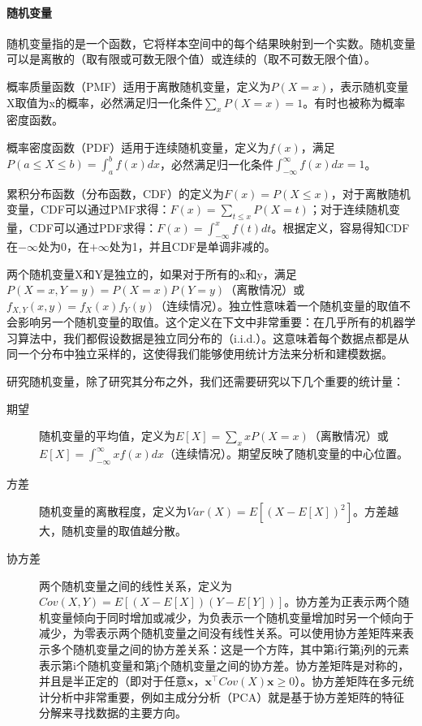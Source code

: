 \paragraph{随机变量}

随机变量指的是一个函数，它将样本空间中的每个结果映射到一个实数。随机变量可以是离散的（取有限或可数无限个值）或连续的（取不可数无限个值）。

概率质量函数（PMF）适用于离散随机变量，定义为$P(X=x)$，表示随机变量X取值为x的概率，必然满足归一化条件$\sum_x P(X=x) = 1$。有时也被称为概率密度函数。

概率密度函数（PDF）适用于连续随机变量，定义为$f(x)$，满足$P(a \leq X \leq b) = \int_a^b f(x) dx$，必然满足归一化条件$\int_{-\infty}^{\infty} f(x) dx = 1$。

累积分布函数（分布函数，CDF）的定义为$F(x) = P(X \leq x)$，对于离散随机变量，CDF可以通过PMF求得：$F(x) = \sum_{t \leq x} P(X=t)$；对于连续随机变量，CDF可以通过PDF求得：$F(x) = \int_{-\infty}^x f(t) dt$。根据定义，容易得知CDF在$-\infty$处为0，在$+\infty$处为1，并且CDF是单调非减的。

两个随机变量X和Y是独立的，如果对于所有的x和y，满足$P(X=x, Y=y) = P(X=x)P(Y=y)$（离散情况）或$f_{X,Y}(x,y) = f_X(x)f_Y(y)$（连续情况）。独立性意味着一个随机变量的取值不会影响另一个随机变量的取值。这个定义在下文中非常重要：在几乎所有的机器学习算法中，我们都假设数据是独立同分布的（i.i.d.）。这意味着每个数据点都是从同一个分布中独立采样的，这使得我们能够使用统计方法来分析和建模数据。

研究随机变量，除了研究其分布之外，我们还需要研究以下几个重要的统计量：
\begin{description}
    \item[期望] 随机变量的平均值，定义为$E[X] = \sum_x x P(X=x)$（离散情况）或$E[X] = \int_{-\infty}^{\infty} x f(x) dx$（连续情况）。期望反映了随机变量的中心位置。
    \item[方差] 随机变量的离散程度，定义为$Var(X) = E[(X - E[X])^2]$。方差越大，随机变量的取值越分散。
    \item[协方差] 两个随机变量之间的线性关系，定义为$Cov(X,Y) = E[(X - E[X])(Y - E[Y])]$。协方差为正表示两个随机变量倾向于同时增加或减少，为负表示一个随机变量增加时另一个倾向于减少，为零表示两个随机变量之间没有线性关系。可以使用协方差矩阵来表示多个随机变量之间的协方差关系：这是一个方阵，其中第i行第j列的元素表示第i个随机变量和第j个随机变量之间的协方差。协方差矩阵是对称的，并且是半正定的（即对于任意$\mathbf{x}$，$\mathbf{x}^\top Cov(X) \mathbf{x} \ge 0$）。协方差矩阵在多元统计分析中非常重要，例如主成分分析（PCA）就是基于协方差矩阵的特征分解来寻找数据的主要方向。
\end{description}

